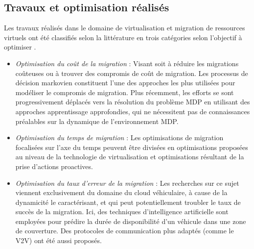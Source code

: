 \subsection{Travaux et optimisation réalisés}
Les travaux réalisés dans le domaine de virtualisation et migration de ressources virtuels ont été classifiés selon la littérature en trois catégories selon l'objectif à optimiser \cite{rejiba2019}.
\begin{itemize}
  \item \emph{Optimisation du coût de la migration} : Visant soit à réduire les migrations coûteuses ou à trouver des compromis de coût de migration. Les processus de décision markovien constituent l'une des approches les plus utilisées pour modéliser le compromis de migration. Plus récemment, les efforts se sont progressivement déplacés vers la résolution du problème MDP en utilisant des approches apprentissage approfondies, qui ne nécessitent pas de connaissances préalables sur la dynamique de l'environnement MDP.
  \item \emph{Optimisation du temps de migration} : Les optimisations de migration focalisées sur l'axe du temps peuvent être divisées en optimisations proposées au niveau de la technologie de virtualisation et optimisations résultant de la prise d'actions proactives.
  \item \emph{Optimisation du taux d'erreur de la migration} : Les recherches sur ce sujet viennent exclusivement du domaine du cloud véhiculaire, à cause de la dynamicité le caractérisant, et qui peut potentiellement troubler le taux de succès de la migration. Ici, des techniques d'intelligence artificielle sont employées pour prédire la durée de disponibilité d'un véhicule dans une zone de couverture. Des protocoles de communication plus adaptés (comme le V2V) ont été aussi proposés.

\end{itemize}